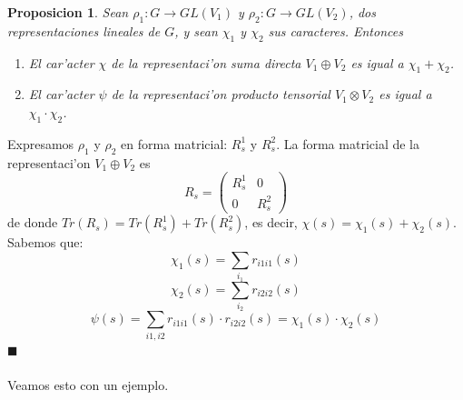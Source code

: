 \documentclass[a4paper,openright,12pt]{book}
\numberwithin{equation}{section} %
\newtheorem{proposicion}{Proposicion}[section] %
\newenvironment{proof}{\noindent{\it Demostracion:}}{\hfill$\blacksquare$} %
\begin{document}
\begin{proposicion}
Sean $\rho_{1}:G \rightarrow GL(V_{1})$ y  $\rho_{2}:G \rightarrow GL(V_{2})$, dos representaciones lineales de $G$, y sean $\chi_{1}$ y $\chi_{2}$ sus caracteres. Entonces
\begin{enumerate}
\item El car'acter $\chi$ de la representaci'on suma directa $V_{1} \oplus V_{2}$ es igual a $\chi_{1} + \chi_{2}$.
\item El car'acter $\psi$ de la representaci'on producto tensorial $V_{1} \otimes V_{2}$ es igual a $\chi_{1} \cdot \chi_{2}$.
\end{enumerate}
\end{proposicion}
\begin{proof}
Expresamos $\rho_{1}$ y $\rho_{2}$ en forma matricial: $R_{s}^{1}$ y $R_{s}^{2}$. La forma matricial de la representaci'on $V_{1} \oplus V_{2}$ es 
\[
R_{s}= \left(
\begin{array}{cc}
R_{s}^{1} & 0 \\
0 & R_{s}^{2}
\end{array}
\right)
\]
de donde $Tr(R_{s})=Tr(R_{s}^{1})+Tr(R_{s}^{2})$, es decir, $\chi(s)=\chi_{1}(s)+\chi_{2}(s)$. Sabemos que:
\[
\chi_{1}(s)=\sum_{i_{1}}r_{i1i1}(s)
\]
\[
\chi_{2}(s)=\sum_{i_{2}}r_{i2i2}(s)
\]
\[
\psi(s)=\sum_{i1,i2}r_{i1i1}(s)\cdot r_{i2i2}(s)=\chi_{1}(s) \cdot \chi_{2}(s)
\]
\end{proof}\\
\\
Veamos esto con un ejemplo.
\end{document}
